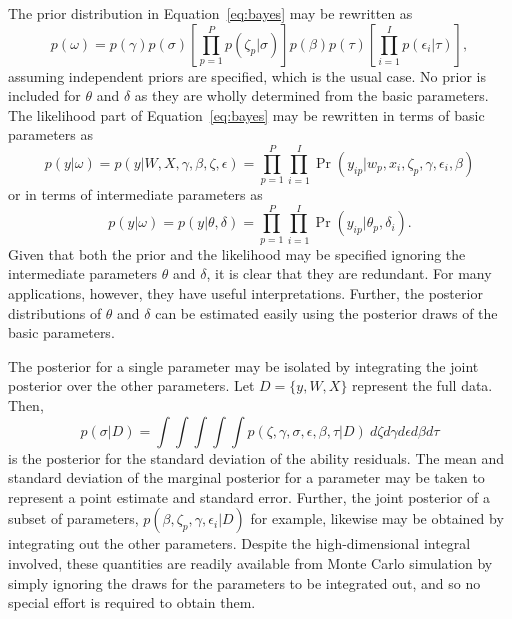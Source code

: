 \documentclass[12pt, letterpaper]{article}
\begin{document}
The prior distribution in Equation~\ref{eq:bayes} may be rewritten as
\begin{equation} \label{eq:prior}
	p(\omega) =
	p(\gamma) p(\sigma)
	\left [ 
		\prod_{p=1}^P p(\zeta_p | \sigma) 
	\right ]
	p(\beta) p(\tau)
	\left [ 
		\prod_{i=1}^I p(\epsilon_i | \tau) 
	\right ]
,\end{equation}
assuming independent priors are specified, which is the usual case. No prior is included for $\theta$ and $\delta$ as they are wholly determined from the basic parameters. 
The likelihood part of Equation~\ref{eq:bayes} may be rewritten in terms of basic parameters as
\begin{equation} \label{eq:bayes-likelihood-alt}
	p(y | \omega) =
	p(y | W, X, \gamma, \beta, \zeta, \epsilon) =
	\prod_{p=1}^P \prod_{i=1}^I 
	\Pr(y_{ip} | w_p, x_i, \zeta_p, \gamma, \epsilon_i, \beta)
\end{equation}
or in terms of intermediate parameters as
\begin{equation} \label{eq:bayes-likelihood}
	p(y | \omega) =
	p(y | \theta, \delta) =
	\prod_{p=1}^P \prod_{i=1}^I \Pr(y_{ip} | \theta_p, \delta_i)
.\end{equation}
Given that both the prior and the likelihood may be specified ignoring the intermediate parameters $\theta$ and $\delta$, it is clear that they are redundant. For many applications, however, they have useful interpretations. Further, the posterior distributions of $\theta$ and $\delta$ can be estimated easily using the posterior draws of the basic parameters.


The posterior for a single parameter may be isolated by integrating the joint posterior over the other parameters. Let $D = \{ y, W, X \}$ represent the full data. Then,
\begin{equation}
	p(\sigma | D) = 
	\int \!\!\! \int \!\!\! \int \!\!\! \int \!\!\! \int
		p(\zeta, \gamma, \sigma, \epsilon, \beta, \tau | D) 
	~d \zeta d \gamma d \epsilon d \beta d \tau
\end{equation}
is the posterior for the standard deviation of the ability residuals. The mean and standard deviation of the marginal posterior for a parameter may be taken to represent a point estimate and standard error. Further, the joint posterior of a subset of parameters, $p(\beta, \zeta_p, \gamma, \epsilon_i | D)$ for example, likewise may be obtained by integrating out the other parameters. Despite the high-dimensional integral involved, these quantities are readily available from Monte Carlo simulation by simply ignoring the draws for the parameters to be integrated out, and so no special effort is required to obtain them.
\end{document}
